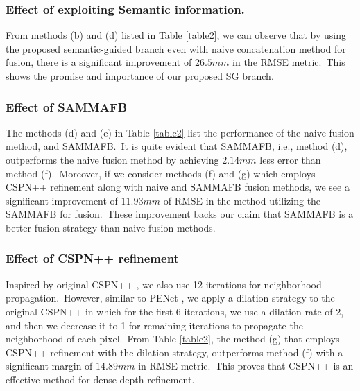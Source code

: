 \documentclass{ieeeaccess}
\begin{document}
\subsubsection{Effect of exploiting Semantic information.}


From methods (b) and (d) listed in Table \ref{table2}, we can observe that by using the proposed semantic-guided branch even with naive concatenation method for fusion, there is a significant improvement of $26.5mm$ in the RMSE metric.~This shows the promise and importance of our proposed SG branch. 

\subsubsection{Effect of SAMMAFB}


The methods (d) and (e) in Table \ref{table2} list the performance of the naive fusion method, and SAMMAFB.~It is quite evident that SAMMAFB, i.e., method (d), outperforms the naive fusion method by achieving $2.14mm$ less error than method (f).~Moreover, if we consider methods (f) and (g) which employs CSPN++ refinement along with naive and SAMMAFB fusion methods, we see a significant improvement of $11.93mm$ of RMSE in the method utilizing the SAMMAFB for fusion.~These improvement backs our claim that SAMMAFB is a better fusion strategy than naive fusion methods.
\subsubsection{Effect of CSPN++ refinement}



Inspired by original CSPN++ \cite{cheng2020cspn++}, we also use 12 iterations for neighborhood propagation.~However, similar to PENet \cite{hu2020PENet}, we apply a dilation strategy to the original CSPN++ in which for the first 6 iterations, we use a dilation rate of 2, and then we decrease it to 1 for remaining iterations to propagate the neighborhood of each pixel.~From Table \ref{table2}, the method (g) that employs CSPN++ refinement with the dilation strategy, outperforms method (f) with a significant margin of $14.89mm$ in RMSE metric.~This proves that CSPN++ is an effective method for dense depth refinement.
\end{document}
